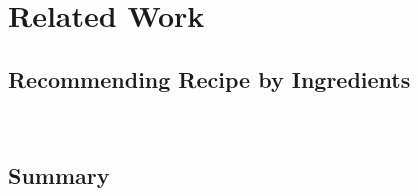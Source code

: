 \chapter{Related Work}\label{chap:related}


\clearpage

\section{Recommending Recipe by Ingredients}\label{sec:related_near}



~\cite{Kuo:2012:IMP:2390776.2390778}


\section{}\label{sec:related_setting}


\section{Summary}
